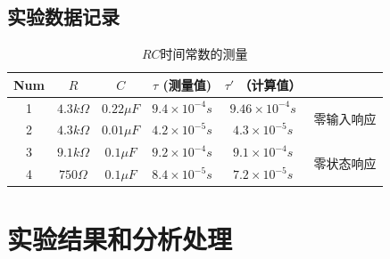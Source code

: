 \documentclass{../source/Experiment}
\begin{document}
        \subsection{实验数据记录}
            \newpage
            \begin{table}[htbp]
                \centering
                \caption{$RC$时间常数的测量}
                \begin{tabular}{c|c|c|c|c|c}
                    \hline
                    Num & $R$   & $C$    & $\tau$ (测量值)   & $\tau '$ （计算值） &                        \\ \hline
                    1 & $4.3k\Omega$ & $0.22\mu F$ & $9.4\times 10^{-4}s$ & $9.46\times 10^{-4}s$ & \multirow{2}{*}{零输入响应} \\ \cline{1-4}
                    2 & $4.3k\Omega$ & $0.01\mu F$ & $4.2\times 10^{-5}s$ & $4.3\times 10^{-5}s$ &                        \\ \hline
                    3 & $9.1k\Omega$ & $0.1\mu F$ & $9.2\times 10^{-4}s$ & $9.1\times 10^{-4}s$ & \multirow{2}{*}{零状态响应} \\ \cline{1-4}
                    4 & $750\Omega$ & $0.1\mu F$ & $8.4\times 10^{-5}s$ & $7.2\times 10^{-5}s$ &                        \\ \hline
                \end{tabular}
            \end{table}
    \section{实验结果和分析处理}
\end{document}
